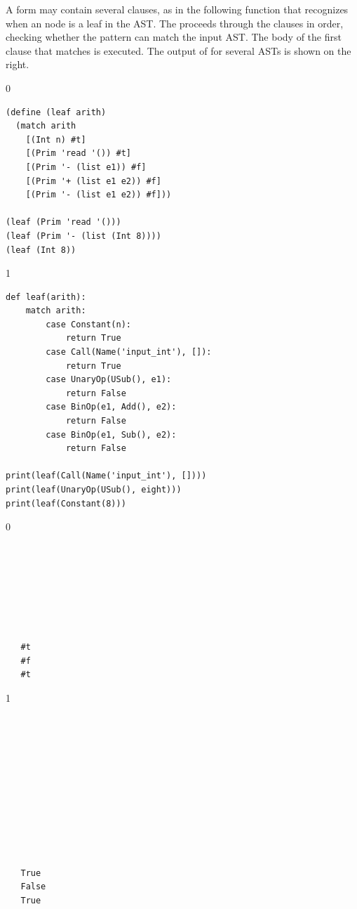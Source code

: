 \documentclass[7x10,nocrop]{TimesAPriori_MIT}%
\def\racketEd{0}
\def\pythonEd{1}
\def\edition{0}
\begin{document}
A  form may contain several clauses, as in the following
function  that recognizes when an \LangInt{} node is a leaf in
the AST. The  proceeds through the clauses in order,
checking whether the pattern can match the input AST. The body of the
first clause that matches is executed. The output of  for
several ASTs is shown on the right.
\begin{center}
\begin{minipage}{0.6\textwidth}
{\if\edition\racketEd
\begin{lstlisting}
(define (leaf arith)
  (match arith
    [(Int n) #t]
    [(Prim 'read '()) #t]
    [(Prim '- (list e1)) #f]
    [(Prim '+ (list e1 e2)) #f]
    [(Prim '- (list e1 e2)) #f]))

(leaf (Prim 'read '()))
(leaf (Prim '- (list (Int 8))))
(leaf (Int 8))
\end{lstlisting}
\fi}
{\if\edition\pythonEd
\begin{lstlisting}
def leaf(arith):
    match arith:
        case Constant(n):
            return True
        case Call(Name('input_int'), []):
            return True
        case UnaryOp(USub(), e1):
            return False
        case BinOp(e1, Add(), e2):
            return False
        case BinOp(e1, Sub(), e2):
            return False

print(leaf(Call(Name('input_int'), [])))
print(leaf(UnaryOp(USub(), eight)))
print(leaf(Constant(8)))
\end{lstlisting}
\fi}
\end{minipage}
\vrule
\begin{minipage}{0.25\textwidth}
{\if\edition\racketEd  
  \begin{lstlisting}






    
   #t
   #f
   #t
\end{lstlisting}
  \fi}
{\if\edition\pythonEd
\begin{lstlisting}






    



    
   True
   False
   True
\end{lstlisting}
\fi}
\end{minipage}
\end{center}
\end{document}
